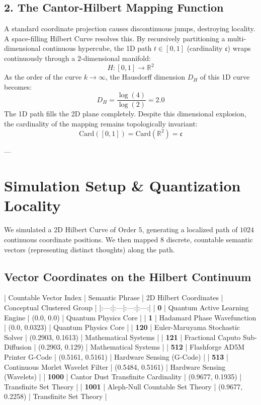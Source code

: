 \documentclass[11pt,twocolumn]{article}
\begin{document}
\subsection{2. The Cantor-Hilbert Mapping Function}
A standard coordinate projection causes discontinuous jumps, destroying locality. A space-filling Hilbert Curve resolves this. By recursively partitioning a multi-dimensional continuous hypercube, the 1D path $t \in [0, 1]$ (cardinality $\mathfrak{c}$) wraps continuously through a $2$-dimensional manifold:
$$H: [0, 1] \to \mathbb{R}^2$$
As the order of the curve $k \to \infty$, the Hausdorff dimension $D_H$ of this 1D curve becomes:
$$D_H = \frac{\log(4)}{\log(2)} = 2.0$$
The 1D path fills the 2D plane completely. Despite this dimensional explosion, the cardinality of the mapping remains topologically invariant:
$$\text{Card}([0, 1]) = \text{Card}(\mathbb{R}^2) = \mathfrak{c}$$

---

\section{Simulation Setup & Quantization Locality}

We simulated a 2D Hilbert Curve of Order $5$, generating a localized path of $1024$ continuous coordinate positions. We then mapped $8$ discrete, countable semantic vectors (representing distinct thoughts) along the path.

\subsection{Vector Coordinates on the Hilbert Continuum}

| Countable Vector Index | Semantic Phrase | 2D Hilbert Coordinates | Conceptual Clustered Group |
|:---:|:---|:---:|:---:|
| \textbf{0} | Quantum Active Learning Engine | (0.0, 0.0) | Quantum Physics Core |
| \textbf{1} | Hadamard Phase Wavefunction | (0.0, 0.0323) | Quantum Physics Core |
| \textbf{120} | Euler-Maruyama Stochastic Solver | (0.2903, 0.1613) | Mathematical Systems |
| \textbf{121} | Fractional Caputo Sub-Diffusion | (0.2903, 0.129) | Mathematical Systems |
| \textbf{512} | Flashforge AD5M Printer G-Code | (0.5161, 0.5161) | Hardware Sensing (G-Code) |
| \textbf{513} | Continuous Morlet Wavelet Filter | (0.5484, 0.5161) | Hardware Sensing (Wavelets) |
| \textbf{1000} | Cantor Dust Transfinite Cardinality | (0.9677, 0.1935) | Transfinite Set Theory |
| \textbf{1001} | Aleph-Null Countable Set Theory | (0.9677, 0.2258) | Transfinite Set Theory |
\end{document}
